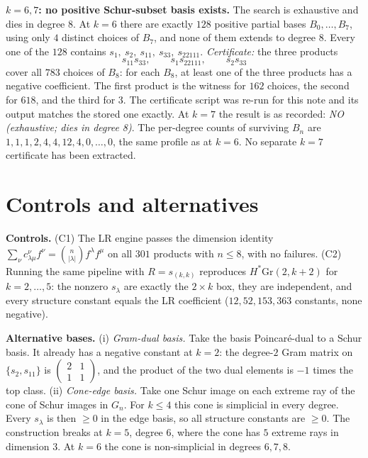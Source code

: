 \documentclass[10pt]{amsart}
\begin{document}
\noindent\textbf{$k=6,7$: no positive Schur-subset basis exists.} The search is exhaustive and dies in
degree $8$. At $k=6$ there are exactly $128$ positive partial bases $B_0,\dots,B_7$, using only $4$
distinct choices of $B_7$, and none of them extends to degree $8$. Every one of the $128$ contains
$s_1,\ s_2,\ s_{11},\ s_{33},\ s_{22111}$. \emph{Certificate:} the three products
\[
s_{11}s_{33},\qquad s_1s_{22111},\qquad s_2s_{33}
\]
cover all $783$ choices of $B_8$: for each $B_8$, at least one of the three products has a negative coefficient.
The first product is the witness for $162$ choices, the second for $618$, and the third for $3$.
The certificate script was re-run for this note and its output matches the stored one exactly.
At $k=7$ the result is as recorded: \emph{NO (exhaustive; dies in degree 8)}. The per-degree counts of
surviving $B_n$ are $1,1,1,2,4,4,12,4,0,\dots,0$, the same profile as at $k=6$. No separate $k=7$
certificate has been extracted.

\section{Controls and alternatives}
\textbf{Controls.} (C1) The LR engine passes the dimension identity
$\sum_\nu c^\nu_{\lambda\mu}f^\nu=\binom{n}{|\lambda|}f^\lambda f^\mu$ on all $301$ products with $n\le8$, with no
failures. (C2) Running the same pipeline with $R=s_{(k,k)}$ reproduces $H^*\mathrm{Gr}(2,k+2)$ for
$k=2,\dots,5$: the nonzero $s_\lambda$ are exactly the $2\times k$ box, they are independent, and every
structure constant equals the LR coefficient ($12,52,153,363$ constants, none negative).

\textbf{Alternative bases.}
(i) \emph{Gram-dual basis.} Take the basis Poincar\'e-dual to a Schur basis. It already has a negative constant at
$k=2$: the degree-$2$ Gram matrix on $\{s_2,s_{11}\}$ is $\left(\begin{smallmatrix}2&1\\1&1\end{smallmatrix}\right)$,
and the product of the two dual elements is $-1$ times the top class.
(ii) \emph{Cone-edge basis.} Take one Schur image on each extreme ray of the cone of Schur images in $G_n$.
For $k\le4$ this cone is simplicial in every degree. Every $s_\lambda$ is then $\ge0$ in the edge basis, so all
structure constants are $\ge0$. The construction breaks at $k=5$, degree $6$, where the cone has $5$ extreme
rays in dimension $3$. At $k=6$ the cone is non-simplicial in degrees $6,7,8$.
\end{document}
